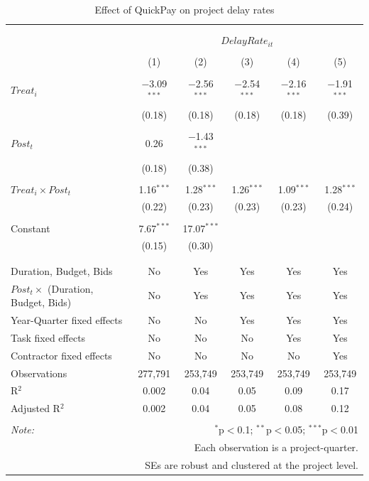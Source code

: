 \documentclass[
]{article}
\begin{document}
\begin{table}[H] \centering 
  \caption{Effect of QuickPay on project delay rates} 
  \label{} 
\small 
\begin{tabular}{@{\extracolsep{-2pt}}lccccc} 
\\[-1.8ex]\hline 
\hline \\[-1.8ex] 
\\[-1.8ex] & \multicolumn{5}{c}{$DelayRate_{it}$} \\ 
\\[-1.8ex] & (1) & (2) & (3) & (4) & (5)\\ 
\hline \\[-1.8ex] 
 $Treat_i$ & $-$3.09$^{***}$ & $-$2.56$^{***}$ & $-$2.54$^{***}$ & $-$2.16$^{***}$ & $-$1.91$^{***}$ \\ 
  & (0.18) & (0.18) & (0.18) & (0.18) & (0.39) \\ 
  & & & & & \\ 
 $Post_t$ & 0.26 & $-$1.43$^{***}$ &  &  &  \\ 
  & (0.18) & (0.38) &  &  &  \\ 
  & & & & & \\ 
 $Treat_i \times Post_t$ & 1.16$^{***}$ & 1.28$^{***}$ & 1.26$^{***}$ & 1.09$^{***}$ & 1.28$^{***}$ \\ 
  & (0.22) & (0.23) & (0.23) & (0.23) & (0.24) \\ 
  & & & & & \\ 
 Constant & 7.67$^{***}$ & 17.07$^{***}$ &  &  &  \\ 
  & (0.15) & (0.30) &  &  &  \\ 
  & & & & & \\ 
\hline \\[-1.8ex] 
Duration, Budget, Bids & No & Yes & Yes & Yes & Yes \\ 
$Post_t \times$  (Duration, Budget, Bids) & No & Yes & Yes & Yes & Yes \\ 
Year-Quarter fixed effects & No & No & Yes & Yes & Yes \\ 
Task fixed effects & No & No & No & Yes & Yes \\ 
Contractor fixed effects & No & No & No & No & Yes \\ 
Observations & 277,791 & 253,749 & 253,749 & 253,749 & 253,749 \\ 
R$^{2}$ & 0.002 & 0.04 & 0.05 & 0.09 & 0.17 \\ 
Adjusted R$^{2}$ & 0.002 & 0.04 & 0.05 & 0.08 & 0.12 \\ 
\hline 
\hline \\[-1.8ex] 
\textit{Note:}  & \multicolumn{5}{r}{$^{*}$p$<$0.1; $^{**}$p$<$0.05; $^{***}$p$<$0.01} \\ 
 & \multicolumn{5}{r}{Each observation is a project-quarter.} \\ 
 & \multicolumn{5}{r}{SEs are robust and clustered at the project level.} \\ 
\end{tabular} 
\end{table}
\end{document}

